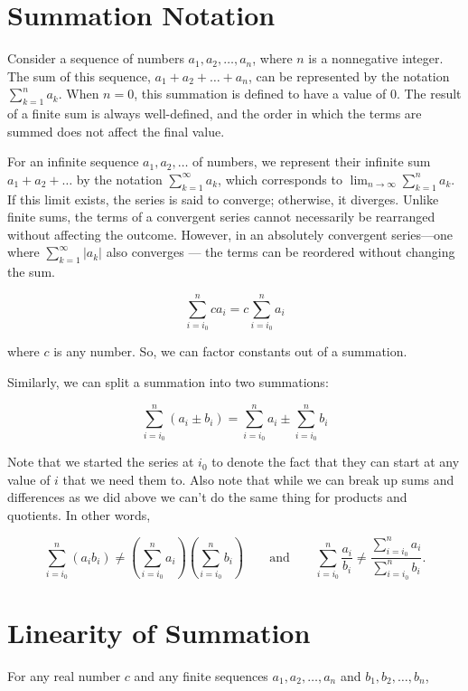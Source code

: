 \section*{Summation Notation}

Consider a sequence of numbers \( a_1, a_2, \ldots, a_n \), where \( n \) is a nonnegative integer. The sum of this sequence, \( a_1 + a_2 + \dots + a_n \), can be represented by the notation \( \sum_{k=1}^n a_k \). When \( n = 0 \), this summation is defined to have a value of 0. The result of a finite sum is always well-defined, and the order in which the terms are summed does not affect the final value.

For an infinite sequence \( a_1, a_2, \ldots \) of numbers, we represent their infinite sum \( a_1 + a_2 + \dots \) by the notation \( \sum_{k=1}^{\infty} a_k \), which corresponds to \( \lim_{n \rightarrow \infty} \sum_{k=1}^n a_k \). If this limit exists, the series is said to converge; otherwise, it diverges. Unlike finite sums, the terms of a convergent series cannot necessarily be rearranged without affecting the outcome. However, in an absolutely convergent series—one where \( \sum_{k=1}^{\infty} |a_k| \) also converges — the terms can be reordered without changing the sum.

\[
    \sum_{i=i_0}^n c a_i=c \sum_{i=i_0}^n a_i
\]

where $c$ is any number. So, we can factor constants out of a summation.

Similarly, we can split a summation into two summations:

\[
\sum_{i=i_0}^n\left(a_i \pm b_i\right)=\sum_{i=i_0}^n a_i \pm \sum_{i=i_0}^n b_i
\]

Note that we started the series at $i_0$ to denote the fact that they can start at any value of $i$ that we need them to. Also note that while we can break up sums and differences as we did above we can't do the same thing for products and quotients. In other words,

\[
    \sum_{i=i_0}^n\left(a_i b_i\right) \neq\left(\sum_{i=i_0}^n a_i\right)\left(\sum_{i=i_0}^n b_i\right) \qquad \text{and} \qquad \sum_{i=i_0}^n \frac{a_i}{b_i} \neq \frac{\sum_{i=i_0}^n a_i}{\sum_{i=i_0}^n b_i}.
\]

\section*{Linearity of Summation}
For any real number $c$ and any finite sequences $a_1, a_2, \ldots, a_n$ and $b_1, b_2, \ldots, b_n$,

